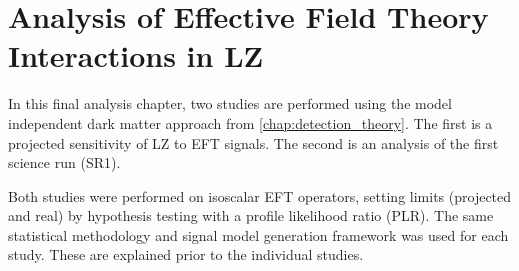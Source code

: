 \chapter{Analysis of Effective Field Theory Interactions in LZ}
\label{chap:analysis_eft_work}
In this final analysis chapter, two studies are performed using the model independent dark matter approach from \autoref{chap:detection_theory}.
The first is a projected sensitivity of LZ to EFT signals.
The second is an analysis of the first science run (SR1).
\par
Both studies were performed on isoscalar EFT operators, setting limits (projected and real) by hypothesis testing with a profile likelihood ratio (PLR).
The same statistical methodology and signal model generation framework was used for each study.
These are explained prior to the individual studies.



%









%

%

